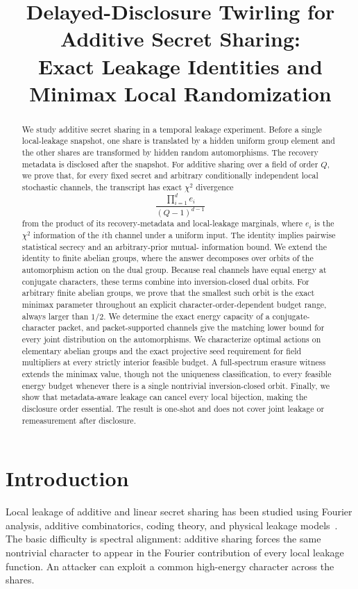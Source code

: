 \documentclass[11pt]{article}
\title{Delayed-Disclosure Twirling for Additive Secret Sharing:\\
Exact Leakage Identities and Minimax Local Randomization}
\author{}
\date{}
\theoremstyle{definition}
\newcommand{\chitwo}{\chi^2}
\begin{document}
\maketitle

\begin{abstract}
We study additive secret sharing in a temporal leakage experiment.  Before a
single local-leakage snapshot, one share is translated by a hidden uniform group
element and the other shares are transformed by hidden random automorphisms.  The
recovery metadata is disclosed after the snapshot.  For additive sharing over a
field of order $Q$, we prove that, for every fixed secret and arbitrary
conditionally independent local stochastic channels, the transcript has exact
$\chitwo$ divergence
\[
    \frac{\prod_{i=1}^d e_i}{(Q-1)^{d-1}}
\]
from the product of its recovery-metadata and local-leakage marginals, where
$e_i$ is the $\chitwo$ information of the $i$th channel under a uniform input.
The identity implies pairwise statistical secrecy and an arbitrary-prior mutual-
information bound.
We extend the identity to finite abelian groups, where the answer decomposes over
orbits of the automorphism action on the dual group.  Because real channels have
equal energy at conjugate characters, these terms combine into inversion-closed
dual orbits.  For arbitrary finite abelian groups, we prove that the smallest
such orbit is the exact minimax parameter throughout an explicit
character-order-dependent budget range, always larger than $1/2$.  We determine
the exact energy capacity of a conjugate-character packet, and packet-supported
channels give the matching lower bound for every joint distribution on the
automorphisms.  We characterize optimal actions on
elementary abelian groups and the exact projective seed requirement for field
multipliers at every strictly interior feasible budget.  A full-spectrum erasure
witness extends the minimax
value, though not the uniqueness classification, to every feasible energy budget
whenever there is a single nontrivial inversion-closed orbit.  Finally, we show that
metadata-aware leakage can cancel every local bijection, making the disclosure
order essential.  The result is one-shot and does not cover joint leakage or
remeasurement after disclosure.
\end{abstract}

\section{Introduction}

Local leakage of additive and linear secret sharing has been studied using
Fourier analysis, additive combinatorics, coding theory, and physical leakage
models~\cite{bdir18,mpsw21,maji22tight,maji22bounded,faust24practice}.
The basic difficulty is spectral alignment: additive sharing forces the same
nontrivial character to appear in the Fourier contribution of every local
leakage function.  An attacker can exploit a common high-energy character across
the shares.
\end{document}
